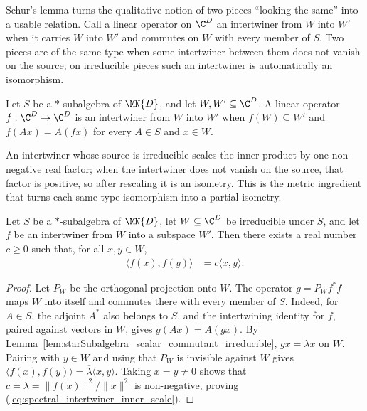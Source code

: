 Schur's lemma turns the qualitative notion of two pieces ``looking the same''
into a usable relation. Call a linear operator on $\C^D$ an intertwiner from
$W$ into $W'$ when it carries $W$ into $W'$ and commutes on $W$ with every
member of $S$. Two pieces are of the same type when some intertwiner between
them does not vanish on the source; on irreducible pieces such an
intertwiner is automatically an isomorphism.

\begin{definition}%
    \label{def:starSubalgebra_intertwiner}
    \leanok
    Let $S$ be a $*$-subalgebra of $\MN{D}$, and let
    $W,W'\subseteq\C^D$. A linear operator $f:\C^D\to\C^D$ is an
    intertwiner from $W$ into $W'$ when $f(W)\subseteq W'$ and
    $f(Ax)=A(fx)$ for every $A\in S$ and $x\in W$.
\end{definition}

An intertwiner whose source is irreducible scales the inner product by one
non-negative real factor; when the intertwiner does not vanish on the source,
that factor is positive, so after rescaling it is an isometry. This is the
metric ingredient that turns each same-type isomorphism into a partial
isometry.

\begin{lemma}%
    \label{lem:starSubalgebra_intertwiner_inner_scale}
    \leanok
    Let $S$ be a $*$-subalgebra of $\MN{D}$, let
    $W\subseteq\C^D$ be irreducible under $S$, and let $f$ be an
    intertwiner from $W$ into a subspace $W'$. Then there exists a real
    number $c\geq0$ such that, for all $x,y\in W$,
    \begin{align}
        \langle f(x),f(y)\rangle
        &=c\langle x,y\rangle.
        \label{eq:spectral_intertwiner_inner_scale}
    \end{align}
\end{lemma}

\begin{proof}
    \leanok
    Let $P_W$ be the orthogonal projection onto $W$. The operator
    $g=P_Wf^*f$ maps $W$ into itself and commutes there with every member of
    $S$. Indeed, for $A\in S$, the adjoint $A^*$ also belongs to $S$, and
    the intertwining identity for $f$, paired against vectors in $W$, gives
    $g(Ax)=A(gx)$. By
    Lemma~\ref{lem:starSubalgebra_scalar_commutant_irreducible},
    $gx=\lambda x$ on $W$. Pairing with $y\in W$ and using that $P_W$ is
    invisible against $W$ gives
    $\langle f(x),f(y)\rangle
    =\overline{\lambda}\langle x,y\rangle$.
    Taking $x=y\neq0$ shows that
    $c=\overline{\lambda}=\lVert f(x)\rVert^2/\lVert x\rVert^2$ is
    non-negative, proving (\ref{eq:spectral_intertwiner_inner_scale}).
\end{proof}

